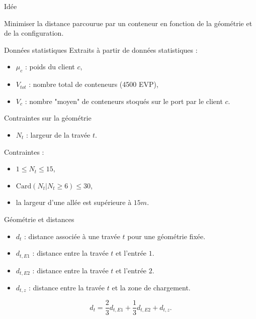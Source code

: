 \begin{frame}{Idée}
  \begin{center}
    Minimiser la distance parcourue par un conteneur en fonction de la géométrie et de la configuration.
  \end{center}
\end{frame}

\begin{frame}{Données statistiques}
  Extraits à partir de données statistiques : 
  \begin{itemize}
    \vfill
  \item $\mu_c$ : poids du client $c$,
    \vfill
  \item $V_{tot}$ : nombre total de conteneurs (4500 EVP),
    \vfill
  \item  $V_c$ : nombre "moyen" de conteneurs stoqués sur le port par le client $c$.
  \end{itemize}
  \vfill
\end{frame}

\begin{frame}{Contraintes sur la géométrie}
  \vfill 
  \begin{itemize}
  \item $N_t$ : largeur de la travée $t$.
  \end{itemize} 
  \vfill
  Contraintes : 
  \vfill
  \begin{itemize}
  \item $1 \leq N_t \leq 15$,
    \vfill
  \item $\mathrm{Card}(N_t\vert N_t \geq  6) \leq  30$,
    \vfill
  \item la largeur d'une allée est supérieure à $15m$.
    \vfill
  \end{itemize}   
  \vfill
\end{frame}

\begin{frame}{Géométrie et distances}
  \vfill
  \begin{itemize}
  \item $d_t$ : distance associée à une travée $t$ pour une géométrie fixée.
    \vfill
  \item $d_{t,E1}$ : distance entre la travée $t$ et l'entrée $1$.
    \vfill
  \item $d_{t,E2}$ :  distance entre la travée $t$ et l'entrée $2$.
    \vfill
  \item $d_{t,z}$ :  distance entre la travée $t$ et la zone de chargement.
  \end{itemize}
  \vfill
  $$d_t=\frac{2}{3}d_{t,E1}+\frac{1}{3}d_{t,E2}+d_{t,z}.$$
  \vfill
\end{frame}


